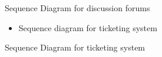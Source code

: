 \documentclass[letterpaper,10pt,english]{sphinxmanual}
\begin{document}
Sequence Diagram for discussion forums
\begin{itemize}
\item {} 
Sequence diagram for ticketing system

\end{itemize}
\begin{figure}[htbp]
\centering

\end{figure}

Sequence Diagram for ticketing system
\end{document}
